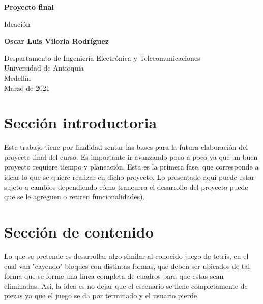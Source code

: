 \documentclass{article}
\begin{document}
\begin{titlepage}
    \begin{center}
        \vspace*{1cm}
            
        \Huge
        \textbf{Proyecto final}
            
        \vspace{0.5cm}
        \LARGE
        Ideación
            
        \vspace{1.5cm}
            
        \textbf{Oscar Luis Viloria Rodríguez}
            
        \vfill
            
        \vspace{0.8cm}
            
        \Large
        Despartamento de Ingeniería Electrónica y Telecomunicaciones\\
        Universidad de Antioquia\\
        Medellín\\
        Marzo de 2021
            
    \end{center}
\end{titlepage}

\tableofcontents
\newpage
\section{Sección introductoria}\label{intro}
Este trabajo tiene por finalidad sentar las bases para la futura elaboración del proyecto final del curso. Es importante ir avanzando poco a poco ya que un buen proyecto requiere tiempo y planeación. Esta es la primera fase, que corresponde a idear lo que se quiere realizar en dicho proyecto. Lo presentado aquí puede estar sujeto a cambios dependiendo cómo trancurra el desarrollo del proyecto puede que se le agreguen o retiren funcionalidades).

\section{Sección de contenido} \label{contenido}
Lo que se pretende es desarrollar algo similar al conocido juego de tetris, en el cual van "cayendo" bloques con distintas formas, que deben ser ubicados de tal forma que se forme una línea completa de cuadros para que estas sean eliminadas. Así, la idea es no dejar que el escenario se llene completamente de piezas ya que el juego se da por terminado y el usuario pierde. \par
\end{document}
